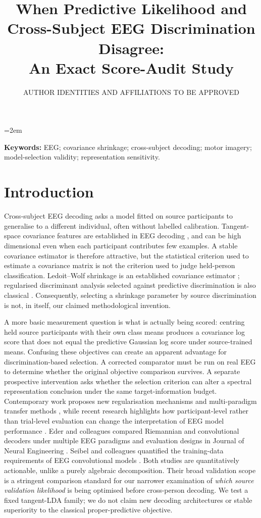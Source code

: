 \documentclass[12pt,a4paper]{article}
\title{When Predictive Likelihood and Cross-Subject EEG Discrimination Disagree:\\
An Exact Score-Audit Study}
\author{AUTHOR IDENTITIES AND AFFILIATIONS TO BE APPROVED}
\date{}
\begin{document}
\emergencystretch=2em
\maketitle

\noindent\textbf{Keywords:} EEG; covariance shrinkage; cross-subject decoding;
motor imagery; model-selection validity; representation sensitivity.

\section{Introduction}
Cross-subject EEG decoding asks a model fitted on source participants to
generalise to a different individual, often without labelled calibration.
Tangent-space covariance features are established in EEG decoding
\cite{barachant2012riemannian}, and can be high dimensional even
when each participant contributes few examples. A stable covariance estimator is therefore
attractive, but the statistical criterion used to estimate a covariance
matrix is not the criterion used to judge held-person classification.
Ledoit--Wolf shrinkage is an established covariance estimator
\cite{ledoit2004}; regularised discriminant analysis selected against
predictive discrimination is also classical \cite{friedman1989}.
Consequently, selecting a shrinkage parameter by source discrimination
is not, in itself, our claimed methodological invention.

A more basic measurement question is what is actually being scored:
centring held source participants with their own class means produces a
covariance log score that does not equal the predictive Gaussian log score
under source-trained means. Confusing these objectives can create an
apparent advantage for discrimination-based selection. A corrected
comparator must be run on real EEG to determine whether the original
objective comparison survives. A separate prospective intervention asks
whether the selection criterion can alter a spectral representation
conclusion under the same target-information budget. Contemporary work proposes
new regularisation mechanisms and multi-paradigm transfer methods
\cite{miao2025freezing,morvay2026wbt,he2026cyclic}, while recent research highlights
how participant-level rather than trial-level evaluation can change the
interpretation of EEG model performance \cite{gil2026subjectvalidation}.
Eder and colleagues compared Riemannian and convolutional
decoders under multiple EEG paradigms and evaluation designs in
Journal of Neural Engineering \cite{eder2024jnebenchmark}.
Seibel and colleagues quantified the training-data requirements
of EEG convolutional models \cite{seibel2026jnedata}.
Both studies are quantitatively actionable, unlike a purely
algebraic decomposition. Their broad validation scope is a
stringent comparison standard for our narrower examination
of \emph{which source validation likelihood} is being
optimised before cross-person decoding. We test a fixed
tangent-LDA family; we do not claim new decoding
architectures or stable superiority to the classical
proper-predictive objective.
\end{document}
